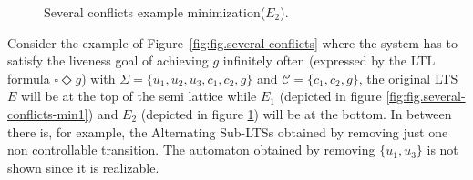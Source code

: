 \begin{figure}[bt]
\centering
\SmallPicture
{}
\caption{Several conflicts example minimization($E_2$).}
\label{fig:fig.several-conflicts-min2}
\MediumPicture
\vspace{-1em}
\end{figure}

Consider the example of Figure~\ref{fig:fig.several-conflicts} where the system has to satisfy the liveness goal of
achieving $g$ infinitely often (expressed
by the LTL formula $\square \Diamond g$)
with $\Sigma = \{u_1, u_2, u_3, c_1, c_2, g\}$ and 
$\mathcal{C} = \{c_1, c_2, g\}$, the original LTS $E$ will be
at the top of the semi lattice while $E_1$ (depicted in figure \ref{fig:fig.several-conflicts-min1}) and $E_2$ (depicted in 
figure \ref{fig:fig.several-conflicts-min2}) will be at 
the bottom.  In between there is, for example, the Alternating Sub-LTSs
obtained by removing just one non controllable transition.  
The automaton obtained by removing $\{u_1, u_3\}$ is not shown
since it is realizable. 
%
%
%

